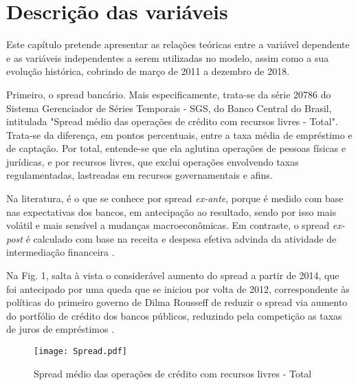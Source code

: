 \documentclass[a4paper, article, 12pt, openany, oneside, english, brazil]{abntex2}
\begin{document}
\section{Descrição das variáveis}

    Este capítulo pretende apresentar as relações teóricas entre a variável dependente e as variáveis independentes a serem utilizadas no modelo, assim como a sua evolução histórica, cobrindo de março de 2011 a dezembro de 2018.

    Primeiro, o spread bancário. Mais especificamente, trata-se da série 20786 do Sistema Gerenciador de Séries Temporais - SGS, do Banco Central do Brasil, intitulada "Spread médio das operações de crédito com recursos livres - Total". Trata-se da diferença, em pontos percentuais, entre a taxa média de empréstimo e de captação. Por total, entende-se que ela aglutina operações de pessoas físicas e jurídicas, e por recursos livres, que exclui operações envolvendo taxas regulamentadas, lastreadas em recursos governamentais e afins.

    Na literatura, é o que se conhece por spread \textit{ex-ante}, porque é medido com base nas expectativas dos bancos, em antecipação ao resultado, sendo por isso mais volátil e mais sensível a mudanças macroeconômicas. Em contraste, o spread \textit{ex-post} é calculado com base na receita e despesa efetiva advinda da atividade de intermediação financeira \cite[p.~2]{almeida15}. 
    
    Na Fig. 1, salta à vista o considerável aumento do spread a partir de 2014, que foi antecipado por uma queda que se iniciou por volta de 2012, correspondente às políticas do primeiro governo de Dilma Rousseff de reduzir o spread via aumento do portfólio de crédito dos bancos públicos, reduzindo pela competição as taxas de juros de empréstimos \cite[p.~1]{almeida15}. 


\begin{figure}[h]
  \centering
    \caption{Spread médio das operações de crédito com recursos livres - Total}
      \texttt{[image: Spread.pdf]}
      \label{spread}
\end{figure}


\end{document}
